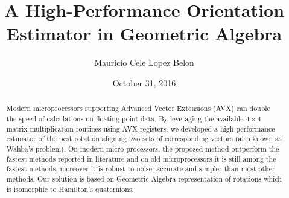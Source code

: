 \documentclass{birkjour}
\numberwithin{equation}{section}
\begin{document}
%
%
%
%
%
%
%
%
%


\title[A High-Performance Orientation Estimator in Geometric Algebra]
 {A High-Performance Orientation Estimator in Geometric Algebra}

\author[Mauricio Cele Lopez Belon]{Mauricio Cele Lopez Belon}
\address{Buenos Aires, Argentina}




\date{October 31, 2016}

\begin{abstract}

Modern microprocessors supporting Advanced Vector Extensions (AVX) can double the speed of calculations on floating point data. By leveraging the available $4\times 4$ matrix multiplication routines using AVX registers, we developed a high-performance estimator of the best rotation aligning two sets of corresponding vectors (also known as Wahba's problem). On modern micro-processors, the proposed method outperform the fastest methods reported in literature and on old microprocessors it is still among the fastest methods, moreover it is robust to noise, accurate and simpler than most other methods. Our solution is based on Geometric Algebra representation of rotations which is isomorphic to Hamilton's quaternions.

\end{abstract}
\end{document}
